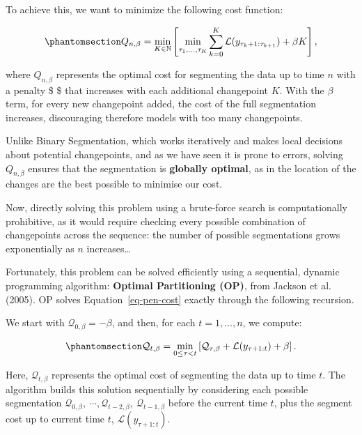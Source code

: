 \documentclass[
  letterpaper,
  DIV=11,
  numbers=noendperiod]{scrreprt}
\begin{document}
To achieve this, we want to minimize the following cost function:

\begin{equation}\phantomsection\label{eq-pen-cost}{
Q_{n, \beta} = \min_{K \in \mathbb{N}} \left[ \min_{\substack{\\ \tau_1, \dots, \tau_K}} \sum_{k = 0}^K \mathcal{L}(y_{\tau_k+1:\tau_{k+1}}) + \beta K
 \right],
}\end{equation}

where \(Q_{n, \beta}\) represents the optimal cost for segmenting the
data up to time \(n\) with a penalty \$ \beta \$ that increases with
each additional changepoint \(K\). With the \(\beta\) term, for every
new changepoint added, the cost of the full segmentation increases,
discouraging therefore models with too many changepoints.

Unlike Binary Segmentation, which works iteratively and makes local
decisions about potential changepoints, and as we have seen it is prone
to errors, solving \(Q_{n, \beta}\) ensures that the segmentation is
\textbf{globally optimal}, as in the location of the changes are the
best possible to minimise our cost.

Now, directly solving this problem using a brute-force search is
computationally prohibitive, as it would require checking every possible
combination of changepoints across the sequence: the number of possible
segmentations grows exponentially as \(n\) increases\ldots{}

Fortunately, this problem can be solved efficiently using a sequential,
dynamic programming algorithm: \textbf{Optimal Partitioning (OP)}, from
Jackson et al. (2005). OP solves Equation~\ref{eq-pen-cost} exactly
through the following recursion.

We start with \(\mathcal{Q}_{0, \beta} = -\beta\), and then, for each
\(t = 1, \dots, n\), we compute:

\begin{equation}\phantomsection\label{eq-optimal-partitioning}{
    \mathcal{Q}_{t, \beta} = \min_{0 \leq \tau < t} \left[ \mathcal{Q}_{\tau, \beta} + \mathcal{L}(y_{\tau + 1:t}) + \beta \right].
}\end{equation}

Here, \(\mathcal{Q}_{t, \beta}\) represents the optimal cost of
segmenting the data up to time \(t\). The algorithm builds this solution
sequentially by considering each possible segmentation
\(\mathcal{Q}_{0, \beta},\ \cdots, \mathcal{Q}_{t-2, \beta},\ \mathcal{Q}_{t-1, \beta}\)
before the current time \(t\), plus the segment cost up to current time
\(t\), \(\mathcal{L}(y_{\tau + 1:t})\).
\end{document}
